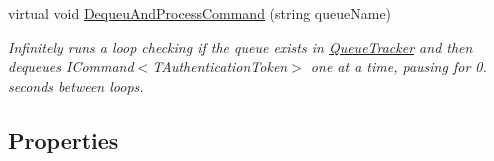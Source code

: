 \begin{DoxyCompactItemize}
virtual void \hyperlink{classCqrs_1_1Bus_1_1QueuedCommandBusReceiver_a6e00e819b9738c694fd05815938cb433_a6e00e819b9738c694fd05815938cb433}{Dequeu\+And\+Process\+Command} (string queue\+Name)
\begin{DoxyCompactList}\small\item\em Infinitely runs a loop checking if the queue exists in \hyperlink{classCqrs_1_1Bus_1_1QueuedCommandBusReceiver_a2fc62989429929acd8ea66808a8c4a78_a2fc62989429929acd8ea66808a8c4a78}{Queue\+Tracker} and then dequeues I\+Command$<$\+T\+Authentication\+Token$>$ one at a time, pausing for 0. seconds between loops. \end{DoxyCompactList}\end{DoxyCompactItemize}
\subsection*{Properties}
